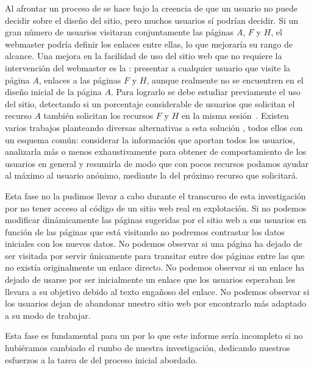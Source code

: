 Al afrontar un proceso de \wum se hace bajo la creencia de que un usuario no puede decidir sobre el diseño del sitio, pero muchos usuarios sí podrían decidir. Si un gran número de usuarios visitaran conjuntamente las páginas $A$, $F$ y $H$, el webmaster podría definir los enlaces entre ellas, lo que mejoraría su rango de alcance. Una mejora en la facilidad de uso del sitio web que no requiere la intervención del webmaster es la \prediccion: presentar a cualquier usuario que visite la página $A$, enlaces a las páginas $F$ y $H$, aunque realmente no se encuentren en el diseño inicial de la página $A$. Para lograrlo se debe estudiar previamente el uso del sitio, detectando si un porcentaje considerable de usuarios que solicitan el recurso $A$ también solicitan los recursos $F$ y $H$ en la misma sesión~\citep{NgHan-EfficientAndEffectiveClusteringMethods-1994}. Existen varios trabajos planteando diversas alternativas a esta solución \citep{SuYangLuZhang-WhatNext-2000,SunChenWenyinMa-IntentionModelingForWebNavigation-2002,ChenZhang-APopularityBasedPredictionModelForWebPrefetching-2003}, todos ellos con un esquema común: considerar la información que aportan todos los usuarios, analizarla más o menos exhaustivamente para obtener \patrones de comportamiento de los usuarios en general y resumirla de modo que con pocos recursos podamos ayudar al máximo al usuario anónimo, mediante la \prediccion del próximo recurso que solicitará.

Esta fase no la pudimos llevar a cabo durante el transcurso de esta investigación por no tener acceso al código de un sitio web real en explotación. Si no podemos modificar dinámicamente las páginas sugeridas por el sitio web a sus usuarios en función de las páginas que está visitando no podremos contrastar los datos iniciales con los nuevos datos. No podemos observar si una página ha dejado de ser visitada por servir únicamente para transitar entre dos páginas entre las que no existía originalmente un enlace directo. No podemos observar si un enlace ha dejado de usarse por ser inicialmente un enlace que los usuarios esperaban les llevara a su objetivo debido al texto engañoso del enlace. No podemos observar si los usuarios dejan de abandonar nuestro sitio web por encontrarlo más adaptado a su modo de trabajar.

Esta fase es fundamental para un \srw por lo que este informe sería incompleto si no hubiéramos cambiado el rumbo de nuestra investigación, dedicando nuestros esfuerzos a la tarea de \dm del proceso inicial abordado.
